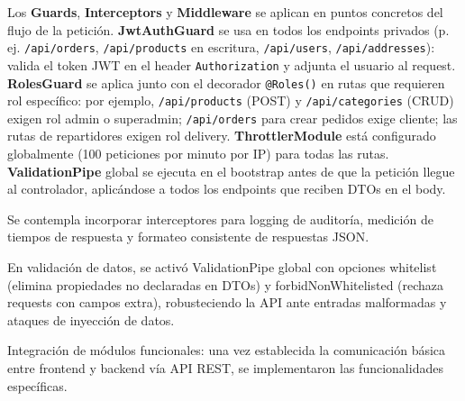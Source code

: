   Los \textbf{Guards}, \textbf{Interceptors} y \textbf{Middleware} se aplican en puntos concretos del flujo de la petición. \textbf{JwtAuthGuard} se usa en todos los endpoints privados (p. ej. \texttt{/api/orders}, \texttt{/api/products} en escritura, \texttt{/api/users}, \texttt{/api/addresses}): valida el token JWT en el header \texttt{Authorization} y adjunta el usuario al request. \textbf{RolesGuard} se aplica junto con el decorador \texttt{@Roles()} en rutas que requieren rol específico: por ejemplo, \texttt{/api/products} (POST) y \texttt{/api/categories} (CRUD) exigen rol admin o superadmin; \texttt{/api/orders} para crear pedidos exige cliente; las rutas de repartidores exigen rol delivery. \textbf{ThrottlerModule} está configurado globalmente (100 peticiones por minuto por IP) para todas las rutas. \textbf{ValidationPipe} global se ejecuta en el bootstrap antes de que la petición llegue al controlador, aplicándose a todos los endpoints que reciben DTOs en el body.

  Se contempla incorporar interceptores para logging de auditoría, medición de tiempos de respuesta y formateo consistente de respuestas JSON.

  En validación de datos, se activó ValidationPipe global con opciones whitelist (elimina propiedades no declaradas en DTOs) y forbidNonWhitelisted (rechaza requests con campos extra), robusteciendo la API ante entradas malformadas y ataques de inyección de datos.

  Integración de módulos funcionales: una vez establecida la comunicación básica entre frontend y backend vía API REST, se implementaron las funcionalidades específicas.

